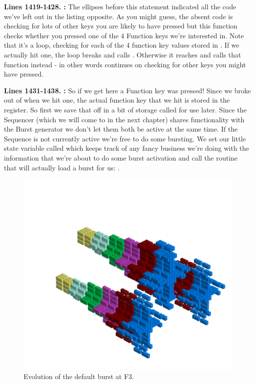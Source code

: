 \textbf{Lines 1419-1428. :} The ellipses before this statement indicated all the code we've
left out in the listing opposite. As you might guess, the absent code is checking for lots of other keys you are likely to have pressed but
this function checks whether you pressed one of the 4 Function keys we're interested in. Note that it's a loop, checking for each of the 4
function key values stored in . If we actually hit one, the loop breaks and calls . Otherwise
it reaches  and calls that function instead - in other words continues on checking for other keys you might have
pressed.

\textbf{Lines 1431-1438. :} So if we get here a Function key was pressed! Since we broke out of 
when we hit one, the actual function key that we hit is stored in the  register. So first we save that off in a bit of storage called
 for use later. Since the Sequencer (which we will come to in the next chapter) shares functionality with the Burst generator
we don't let them both be active at the same time. If the Sequence is not currently active we're free to do some bursting. We set our little state
variable called  which keeps track of any fancy business we're doing with the information that we're about to do some 
burst activation and call the routine that will actually load a burst for us: .


\clearpage
\begin{figure}[H]
    \centering
    \begin{adjustbox}{width=12cm,center}
      \includegraphics[width=12cm]{src/patterns/bursts/pattern1-45.png}%
    \end{adjustbox}
\caption{Evolution of the default burst at F3.}
\end{figure}
\clearpage


